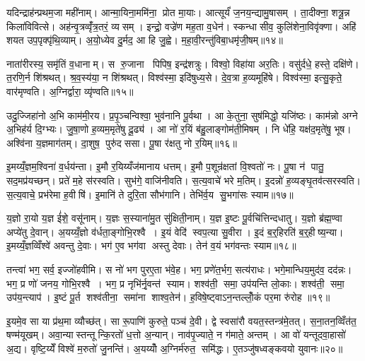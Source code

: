 यदिन्द्राह॑न्प्रथम॒जा मही॑नाम्। आन्मा॒यिना॒ममि॑ना॒ प्रोत मा॒याः। आत्सूर्यं॑ ज॒नय॒न्द्यामु॒षासम्। ता॒दीक्ना॒ शत्रू॒न्न किला॑विवित्से। अह॑न्वृ॒त्रव्वृँ॑त्र॒तरं॒ व्यसम्। इन्द्रो॒ वज्रे॑ण मह॒ता व॒धेन॑। स्कन्धासीव॒ कुलि॑शेना॒विवृ॑क्णा। अहि॑ शयत उप॒पृक्पृ॑थि॒व्याम्। अ॒यो॒ध्येव दु॒र्मद॒ आ हि जु॒ह्वे। म॒हा॒वी॒रन्तु॑विबा॒धमृ॑जी॒षम्॥१४॥

नाता॑रीरस्य॒ समृ॑तिं व॒धानाम्। स रु॒जाना पिपिष॒ इन्द्र॑शत्रुः। विश्वो॒ विहा॑या अर॒तिः। वसु॑र्दधे॒ हस्ते॒ दक्षि॑णे। त॒रणि॒र्न शि॑श्रथत्। श्र॒व॒स्य॑या॒ न शि॑श्रथत्। विश्व॑स्मा॒ इदि॑षुध्य॒से। दे॒व॒त्रा ह॒व्यमूहि॑षे। विश्व॑स्मा॒ इत्सु॒कृते॒ वार॑मृण्वति। अ॒ग्निर्द्वारा॒ व्यृ॑ण्वति॥१५॥

उदु॒ज्जिहा॑नो अ॒भि काम॑मी॒रय\sn{}। प्र॒पृ॒ञ्चन्विश्वा॒ भुव॑नानि पू॒र्वथा। आ के॒तुना॒ सुष॑मिद्धो॒ यजि॑ष्ठः। काम॑न्नो अग्ने अ॒भिह॑र्य दि॒ग्भ्यः। जु॒षा॒णो ह॒व्यम॒मृते॑षु दू॒ढ्य॑। आ नो॑ र॒यिं ब॑हु॒लाङ्गोम॑ती॒मिषम्। नि धे॑हि॒ यक्ष॑द॒मृते॑षु॒ भूष\sn{}। अश्वि॑ना य॒ज्ञमाग॑तम्। दा॒शुष॒ पुरु॑दससा। पू॒षा र॑क्षतु नो र॒यिम्॥१६॥

इ॒मय्यँ॒ज्ञम॒श्विना॑ व॒र्धय॑न्ता। इ॒मौ र॒यिय्यँज॑मानाय धत्तम्। इ॒मौ प॒शून्र॑क्षतां वि॒श्वतो॑ नः। पू॒षा न॑ पातु॒ सद॒मप्र॑यच्छन्। प्रते॑ म॒हे स॑रस्वति। सुभ॑गे॒ वाजि॑नीवति। स॒त्य॒वाचे॑ भरे म॒तिम्। इ॒दन्नो॑ ह॒व्यङ्घृ॒तव॑त्सरस्वति। स॒त्य॒वाचे॒ प्रभ॑रेमा ह॒वीषि॑। इ॒मानि॑ ते दुरि॒ता सौभ॑गानि। तेभि॑र्व॒य सु॒भगा॑सः स्याम॥१७॥\anuvakamend[व॒ज्र्यही॑नामृजी॒षं व्यृ॑ण्वति रक्षतु नो र॒यि सौभ॑गा॒न्येकं च]

य॒ज्ञो रा॒यो य॒ज्ञ ई॑शे॒ वसू॑नाम्। य॒ज्ञः स॒स्याना॑मु॒त सु॑क्षिती॒नाम्। य॒ज्ञ इ॒ष्टः पू॒र्वचि॑त्तिन्दधातु। य॒ज्ञो ब्र॑ह्म॒ण्वा अप्ये॑तु दे॒वान्। अ॒यय्यँ॒ज्ञो व॑र्धता॒ङ्गोभि॒रश्वै। इ॒यं वेदि॑ स्वप॒त्या सु॒वीरा। इ॒दं ब॒र्॒हिरति॑ ब॒र्॒हीष्य॒न्या। इ॒मय्यँ॒ज्ञव्विँश्वे॑ अवन्तु दे॒वाः। भग॑ ए॒व भग॑वा अस्तु देवाः। तेन॑ व॒यं भग॑वन्तः स्याम॥१८॥

तन्त्वा॑ भग॒ सर्व॒ इज्जो॑हवीमि। स नो॑ भग पुरए॒ता भ॑वे॒ह। भग॒ प्रणे॑त॒र्भग॒ सत्य॑राधः। भगे॒मान्धिय॒मुद॑व॒ दद॑न्नः। भग॒ प्र णो॑ जनय॒ गोभि॒रश्वै। भग॒ प्र नृभि॑र्नृ॒वन्त॑ स्याम। शश्व॑ती॒ समा॒ उप॑यन्ति लो॒काः। शश्व॑ती॒ समा॒ उप॑य॒न्त्याप॑। इ॒ष्टं पू॒र्त शश्व॑तीना॒ समा॑ना शाश्व॒तेन॑। ह॒विषे॒ष्ट्वाऽन॒न्तल्लोँ॒कं पर॒मा रु॑रोह ॥१९॥

इ॒यमे॒व सा या प्र॑थ॒मा व्यौच्छ॑त्। सा रू॒पाणि॑ कुरुते॒ पञ्च॑ दे॒वी। द्वे स्वसा॑रौ वयत॒स्तन्त्र॑मे॒तत्। स॒ना॒तन॒व्विँत॑त॒ षण्म॑यूखम्। अवा॒न्यास्तन्तून्कि॒रतो॑ ध॒त्तो अ॒न्यान्। नाव॑पृ॒ज्याते॒ न ग॑माते॒ अन्तम्। आ वो॑ यन्तूदवा॒हासो॑ अ॒द्य। वृष्टि॒य्येँ विश्वे॑ म॒रुतो॑ जु॒नन्ति॑। अ॒यय्योँ अ॒ग्निर्म॑रुत॒ समि॑द्धः। ए॒तञ्जु॑षध्वङ्कवयो युवानः॥२०॥

